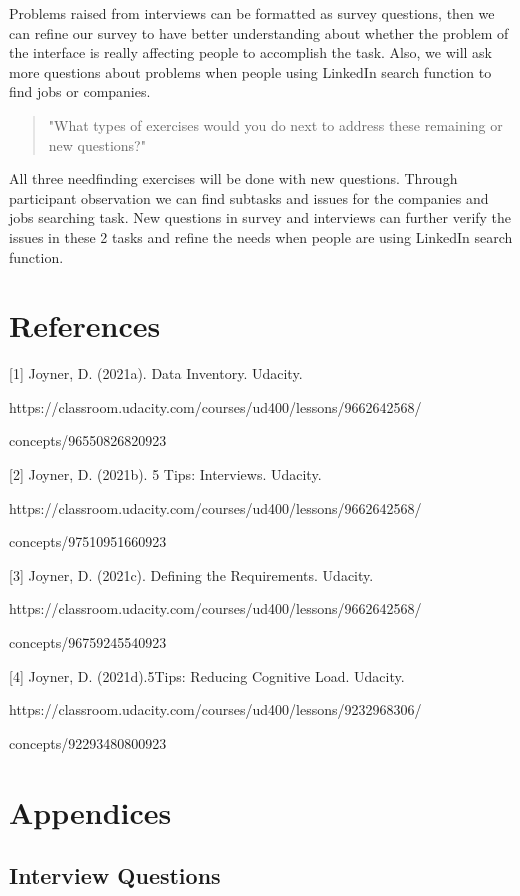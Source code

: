 \documentclass[
	letterpaper, %
]{jdf}
\begin{document}
Problems raised from interviews can be formatted as survey questions, then we can refine our survey to have better understanding about whether the problem of the interface is really affecting people to accomplish the task. Also, we will ask more questions about problems when people using LinkedIn search function to find jobs or companies.

\begin{quotation}
"What types of exercises would you do next to address these remaining or new questions?"
\end{quotation}

All three needfinding exercises will be done with new questions. Through participant observation we can find subtasks and issues for the companies and jobs searching task. New questions in survey and interviews can further verify the issues in these 2 tasks and refine the needs when people are using LinkedIn search function.

\section{References}

[1] Joyner, D. (2021a). Data Inventory. Udacity.

https://classroom.udacity.com/courses/ud400/lessons/9662642568/

concepts/96550826820923

[2] Joyner, D. (2021b). 5 Tips: Interviews. Udacity. 

https://classroom.udacity.com/courses/ud400/lessons/9662642568/

concepts/97510951660923

[3] Joyner, D. (2021c). Defining the Requirements. Udacity. 

https://classroom.udacity.com/courses/ud400/lessons/9662642568/

concepts/96759245540923

[4] Joyner, D. (2021d).5Tips: Reducing Cognitive Load. Udacity. 

https://classroom.udacity.com/courses/ud400/lessons/9232968306/

concepts/92293480800923

\section{Appendices}

\subsection{Interview Questions}
\end{document}
